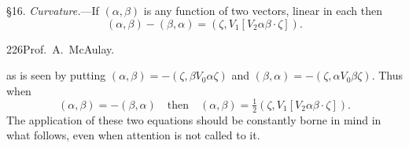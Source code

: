 \documentclass[11pt]{article}
\begin{document}
\indent \S16. \emph{Curvature.}---If $(\alpha,\beta)$ is any function of two vectors, linear in each then
\begin{equation}(\alpha,\beta)-(\beta,\alpha)=(\zeta,V_1[V_2\alpha\beta\mathbin{\cdot}\zeta]).\tag{1}\end{equation}
\newpage\thispagestyle{empty}\begin{center}226\hfill Prof.\ A.\ McAulay.\end{center}
as is seen by putting $(\alpha,\beta)=-(\zeta,\beta V_0\alpha\zeta)$ and $(\beta,\alpha)=-(\zeta,\alpha V_0\beta\zeta)$. Thus when
\begin{equation}(\alpha,\beta)=-(\beta,\alpha)\quad\text{then}\quad(\alpha,\beta)=\tfrac12(\zeta,V_1[V_2\alpha\beta\mathbin{\cdot}\zeta]).\tag{2}\end{equation}
The application of these two equations should be constantly borne in mind in what follows, even when attention is not called to it.
\end{document}
